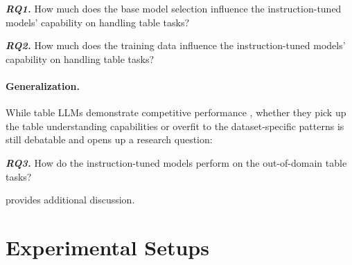 \documentclass[11pt]{article}
\begin{document}
\noindent\textit{\textbf{RQ1.}} How much does the base model selection influence the instruction-tuned models' capability on handling table tasks?

\noindent\textit{\textbf{RQ2.}} How much does the training data influence the instruction-tuned models' capability on handling table tasks?


\paragraph{Generalization.}
While table LLMs demonstrate competitive performance \citep{zhang-etal-2024-tablellama}, whether they pick up the table understanding capabilities or overfit to the dataset-specific patterns is still debatable \citep{deng2025rethinking} and opens up a research question:

\noindent\textit{\textbf{RQ3.}} How do the instruction-tuned models perform on the out-of-domain table tasks? 







 provides additional discussion.


\section{Experimental Setups}
\label{sec: experimental-setups}
\end{document}
